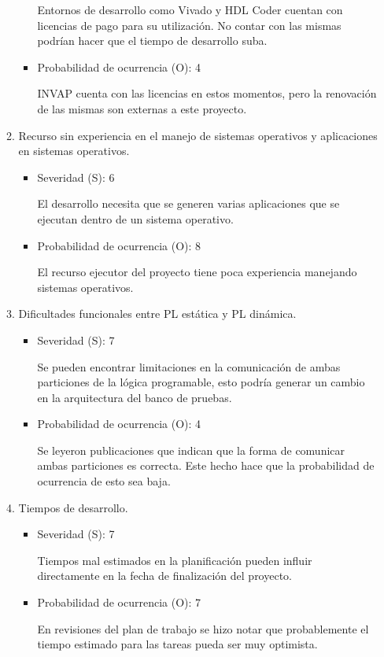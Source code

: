 \documentclass[
11pt, %
]{charter}
\begin{document}
\begin{enumerate}[]
\begin{enumerate}[$\text{Riesgo}$ 1:, leftmargin=*,align=left]
\begin{itemize}
			Entornos de desarrollo como Vivado y HDL Coder cuentan con licencias de pago para su utilización. No contar con las mismas podrían hacer que el tiempo de desarrollo suba.
			\item Probabilidad de ocurrencia (O): 4
			
			INVAP cuenta con las licencias en estos momentos, pero la renovación de las mismas son externas a este proyecto. 
		\end{itemize}

		\item Recurso sin experiencia en el manejo de sistemas operativos y aplicaciones en sistemas operativos.
		\begin{itemize}
			\item Severidad (S): 6
			
			El desarrollo necesita que se generen varias aplicaciones que se ejecutan dentro de un sistema operativo.
			\item Probabilidad de ocurrencia (O): 8
			
			El recurso ejecutor del proyecto tiene poca experiencia manejando sistemas operativos.
		\end{itemize}

		\item Dificultades funcionales entre PL estática y PL dinámica.
		\begin{itemize}
			\item Severidad (S): 7
			
			Se pueden encontrar limitaciones en la comunicación de ambas particiones de la lógica programable, esto podría generar un cambio en la arquitectura del banco de pruebas.
			\item Probabilidad de ocurrencia (O): 4
			
			Se leyeron publicaciones que indican que la forma de comunicar ambas particiones es correcta. Este hecho hace que la probabilidad de ocurrencia de esto sea baja. 
		\end{itemize}

		\item Tiempos de desarrollo.
		\begin{itemize}
			\item Severidad (S): 7
			
			Tiempos mal estimados en la planificación pueden influir directamente en la fecha de finalización del proyecto.
			\item Probabilidad de ocurrencia (O): 7
			
			En revisiones del plan de trabajo se hizo notar que probablemente el tiempo estimado para las tareas pueda ser muy optimista. 
		\end{itemize}


\end{enumerate}
\end{enumerate}
\end{document}
